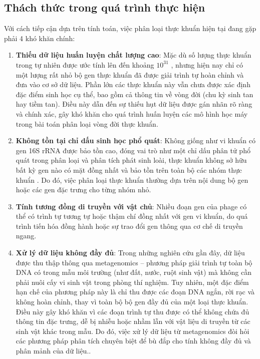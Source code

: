 \subsection{Thách thức trong quá trình thực hiện}
Với cách tiếp cận dựa trên tính toán, việc phân loại thực khuẩn hiện tại đang gặp phải 4 khó khăn chính:
\begin{enumerate}
    \item \textbf{Thiếu dữ liệu huấn luyện chất lượng cao}: Mặc dù số lượng thực khuẩn trong tự nhiên được ước tính lên đến khoảng $10^{31}$ \cite{doi:10.1128/jb.00052-20}, nhưng hiện nay chỉ có một lượng rất nhỏ bộ gen thực khuẩn đã được giải trình tự hoàn chỉnh và đưa vào cơ sở dữ liệu. Phần lớn các thực khuẩn này vẫn chưa được xác định đặc điểm sinh học cụ thể, bao gồm cả thông tin về vòng đời (chu kỳ sinh tan hay tiềm tan). Điều này dẫn đến sự thiếu hụt dữ liệu được gán nhãn rõ ràng và chính xác, gây khó khăn cho quá trình huấn luyện các mô hình học máy trong bài toán phân loại vòng đời thực khuẩn.
    \item \textbf{Không tồn tại chỉ dấu sinh học phổ quát}: Không giống như vi khuẩn có gen 16S rRNA được bảo tồn cao, đóng vai trò như một chỉ dấu phân tử phổ quát trong phân loại và phân tích phát sinh loài, thực khuẩn không sở hữu bất kỳ gen nào có mặt đồng nhất và bảo tồn trên toàn bộ các nhóm thực khuẩn \cite{PMID:31061483}. Do đó, việc phân loại thực khuẩn thường dựa trên nội dung bộ gen hoặc các gen đặc trưng cho từng nhóm nhỏ.
    \item \textbf{Tính tương đồng di truyền với vật chủ}: Nhiều đoạn gen của phage có thể có trình tự tương tự hoặc thậm chí đồng nhất với gen vi khuẩn, do quá trình tiến hóa đồng hành hoặc sự trao đổi gen thông qua cơ chế di truyền ngang.
    \item \textbf{Xử lý dữ liệu không đầy đủ}: Trong những nghiên cứu gần đây, dữ liệu được thu thập thông qua metagenomics – phương pháp giải trình tự toàn bộ DNA có trong mẫu môi trường (như đất, nước, ruột sinh vật) mà không cần phải nuôi cấy vi sinh vật trong phòng thí nghiệm. Tuy nhiên, một đặc điểm hạn chế của phương pháp này là chỉ thu được các đoạn DNA ngắn, rời rạc và không hoàn chỉnh, thay vì toàn bộ bộ gen đầy đủ của một loại thực khuẩn. Điều này gây khó khăn vì các đoạn trình tự thu được có thể không chứa đủ thông tin đặc trưng, dễ bị nhiễu hoặc nhầm lẫn với vật liệu di truyền từ các sinh vật khác trong mẫu. Do đó, việc xử lý dữ liệu từ metagenomics đòi hỏi các phương pháp phân tích chuyên biệt để bù đắp cho tính không đầy đủ và phân mảnh của dữ liệu..
\end{enumerate}


